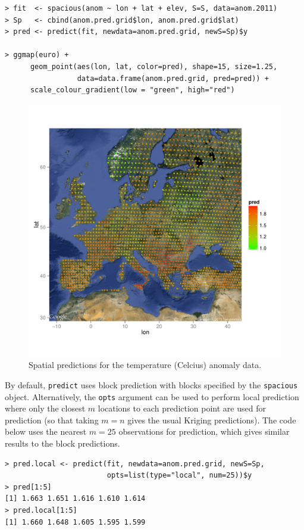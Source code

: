 \documentclass[11pt]{article}
\begin{document}
\begin{verbatim}
> fit  <- spacious(anom ~ lon + lat + elev, S=S, data=anom.2011)
> Sp   <- cbind(anom.pred.grid$lon, anom.pred.grid$lat)
> pred <- predict(fit, newdata=anom.pred.grid, newS=Sp)$y

> ggmap(euro) +
      geom_point(aes(lon, lat, color=pred), shape=15, size=1.25,
                 data=data.frame(anom.pred.grid, pred=pred)) +
      scale_colour_gradient(low = "green", high="red")
\end{verbatim}

\begin{figure}
	\caption{Spatial predictions for the temperature (Celcius) anomaly data.}\label{f:pred}
	\centering
	\includegraphics[width=6in]{figures/pred.pdf}
\end{figure}


By default, {\tt predict} uses block prediction \citep{Eidsvik:2013} with blocks specified by the {\tt spacious} object.
Alternatively, the {\tt opts} argument can be used to perform local prediction where only the closest $m$ locations to each prediction point are used for prediction (so that taking $m=n$ gives the usual Kriging predictions).
The code below uses the nearest $m=25$ observations for prediction, which gives similar results to the block predictions.

\begin{verbatim}
> pred.local <- predict(fit, newdata=anom.pred.grid, newS=Sp,
                        opts=list(type="local", num=25))$y
> pred[1:5]
[1] 1.663 1.651 1.616 1.610 1.614
> pred.local[1:5]
[1] 1.660 1.648 1.605 1.595 1.599
\end{verbatim}
\end{document}
